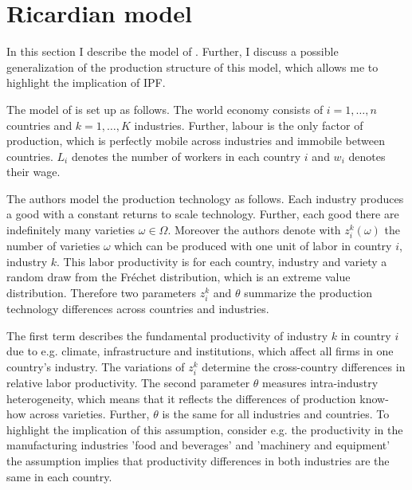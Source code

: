 \section{Ricardian model}
\label{sec:Ricardo}
In this section I  describe the model of \textcite{costinot}. Further,  I discuss a possible generalization of the production structure of this model, which allows me to highlight the implication of IPF. \par 

The model of \textcite{costinot} is set up as follows. The world economy consists of  $i = 1, \dots, n$ countries and $k = 1, \dots , K $ industries. Further, labour is the only factor of production, which is perfectly mobile across industries and immobile between countries. $L_i $ denotes the number of workers in each country $i$  and $ w_i $ denotes their wage. \par %

The authors model the production technology as follows.  Each industry produces a good with a constant returns to scale technology. Further, each good there are indefinitely many varieties $\omega \in \Omega$. Moreover the authors denote with $z^k_i(\omega)$ the number of varieties $\omega$ which can be produced with one unit of labor in country $i$, industry $k$. This labor productivity is for each country, industry and variety a random draw from the Fr{\'e}chet distribution, which is an extreme value distribution. Therefore two parameters $z^k_{i}$ and $\theta$ summarize the  production technology differences across countries and industries. \par 

The first term describes the fundamental productivity of industry $k$ in country $i$ due to e.g. climate, infrastructure and institutions, which affect all firms in one country's industry. The variations of $z^k_i$ determine the cross-country differences in relative labor productivity. The second parameter $\theta$ measures intra-industry heterogeneity, which means that it reflects the differences of production know-how across varieties.  Further, $\theta$ is the same for all industries and countries. To highlight the implication of this assumption,
consider e.g. the productivity in the manufacturing industries 'food and beverages' and 'machinery and equipment'  the assumption implies that  productivity differences in both industries are the same in each country.\par %

